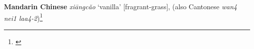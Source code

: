\begin{etymology}\label{ety:xiangcao}
\textbf{Mandarin Chinese}  \textit{xiāngcǎo} `vanilla' [fragrant-grass], (also Cantonese  \textit{wan4 nei1 laa4-2})\footnote{\textcite{mdbg}}
\end{etymology}